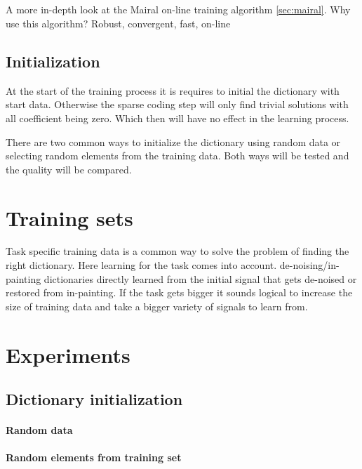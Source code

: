 \subsection{\trainDL}
A more in-depth look at the Mairal on-line training algorithm \ref{sec:mairal}. 
Why use this algorithm? Robust, convergent, fast, on-line

\subsection{Initialization}
At the start of the training process it is requires to initial the dictionary with start data.
Otherwise the sparse coding step will only find trivial solutions with all coefficient being zero. Which then will have no effect in the learning process.

There are two common ways to initialize the dictionary using random data or selecting random elements from the training data. Both ways will be tested and 
the quality will be compared.

\section{Training sets}
Task specific training data is a common way to solve the problem of finding the right dictionary. 
Here learning for the task comes into account. de-noising/in-painting dictionaries directly learned from the initial
signal that gets de-noised or restored from in-painting.
If the task gets bigger it sounds logical to increase the size of training data and take a bigger variety of signals to learn from.



\section{Experiments}

\subsection{Dictionary initialization}
\paragraph{Random data} 
\paragraph{Random elements from training set}

